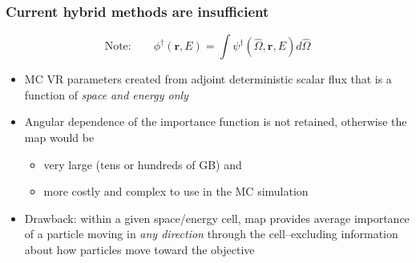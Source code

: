 \documentclass[handout]{beamer}
\renewcommand{\(}{\begin{columns}}
\renewcommand{\)}{\end{columns}}
\newcommand{\<}[1]{\begin{column}{#1}}
\renewcommand{\>}{\end{column}}
\newcommand{\vOmega}{\ensuremath{\hat{\Omega}}}
\newcommand{\ve}[1]{\ensuremath{\mathbf{#1}}}
\begin{document}
%
%


\begin{frame}[fragile]
  \frametitle{Current hybrid methods are insufficient}

\[\text{Note:}\qquad\phi^{\dagger}(\ve{r},E) = \int \psi^{\dagger}(\vOmega, 
		\ve{r},E) d\vOmega\]

	\begin{itemize}
	\item MC VR parameters created from adjoint deterministic scalar flux that is a function of \textit{space and energy only} \vspace*{1 em}
	\pause
	\item Angular dependence of the importance function is not retained, otherwise the map would be 
	\begin{itemize}
	  \item very large (tens or hundreds of GB) and
	  \item more costly and complex to use in the MC simulation 
	\end{itemize}
	\pause
	\item Drawback: within a given space/energy cell, map provides average importance of a particle moving in \textit{any direction} through the cell--excluding information about how particles move \alert{toward the objective}
	\end{itemize}

\end{frame}
\end{document}
